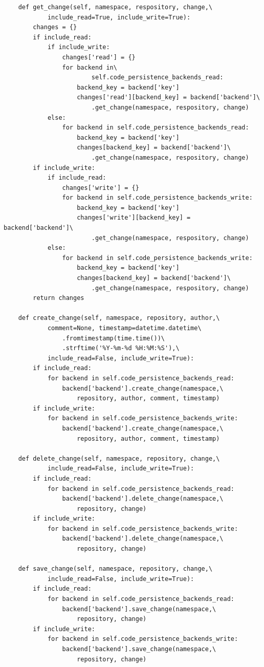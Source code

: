 \begin{lstlisting}
    def get_change(self, namespace, respository, change,\
            include_read=True, include_write=True):
        changes = {}
        if include_read:
            if include_write:
                changes['read'] = {}
                for backend in\
                        self.code_persistence_backends_read:
                    backend_key = backend['key']
                    changes['read'][backend_key] = backend['backend']\
                        .get_change(namespace, respository, change)
            else:
                for backend in self.code_persistence_backends_read:
                    backend_key = backend['key']
                    changes[backend_key] = backend['backend']\
                        .get_change(namespace, respository, change)
        if include_write:
            if include_read:
                changes['write'] = {}
                for backend in self.code_persistence_backends_write:
                    backend_key = backend['key']
                    changes['write'][backend_key] = backend['backend']\
                        .get_change(namespace, respository, change)
            else:
                for backend in self.code_persistence_backends_write:
                    backend_key = backend['key']
                    changes[backend_key] = backend['backend']\
                        .get_change(namespace, respository, change)
        return changes

    def create_change(self, namespace, repository, author,\
            comment=None, timestamp=datetime.datetime\
                .fromtimestamp(time.time())\
                .strftime('%Y-%m-%d %H:%M:%S'),\
            include_read=False, include_write=True):
        if include_read:
            for backend in self.code_persistence_backends_read:
                backend['backend'].create_change(namespace,\
                    repository, author, comment, timestamp)
        if include_write:
            for backend in self.code_persistence_backends_write:
                backend['backend'].create_change(namespace,\
                    repository, author, comment, timestamp)

    def delete_change(self, namespace, repository, change,\
            include_read=False, include_write=True):
        if include_read:
            for backend in self.code_persistence_backends_read:
                backend['backend'].delete_change(namespace,\
                    repository, change)
        if include_write:
            for backend in self.code_persistence_backends_write:
                backend['backend'].delete_change(namespace,\
                    repository, change)

    def save_change(self, namespace, repository, change,\
            include_read=False, include_write=True):
        if include_read:
            for backend in self.code_persistence_backends_read:
                backend['backend'].save_change(namespace,\
                    repository, change)
        if include_write:
            for backend in self.code_persistence_backends_write:
                backend['backend'].save_change(namespace,\
                    repository, change)
\end{lstlisting}
\lstset{language=Bash}

